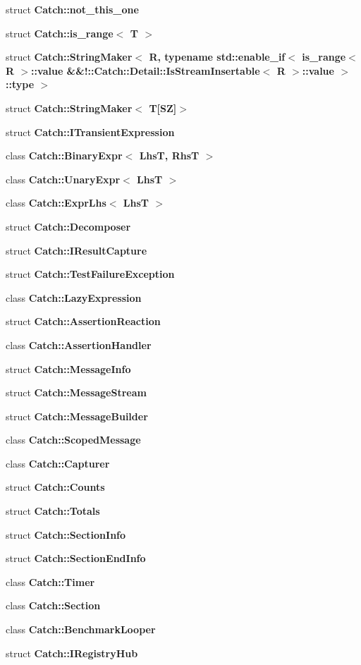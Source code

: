 \begin{DoxyCompactItemize}
struct \textbf{ Catch\+::not\+\_\+this\+\_\+one}
\item 
struct \textbf{ Catch\+::is\+\_\+range$<$ T $>$}
\item 
struct \textbf{ Catch\+::\+String\+Maker$<$ R, typename std\+::enable\+\_\+if$<$ is\+\_\+range$<$ R $>$\+::value \&\&!\+::\+Catch\+::\+Detail\+::\+Is\+Stream\+Insertable$<$ R $>$\+::value $>$\+::type $>$}
\item 
struct \textbf{ Catch\+::\+String\+Maker$<$ T[\+S\+Z]$>$}
\item 
struct \textbf{ Catch\+::\+I\+Transient\+Expression}
\item 
class \textbf{ Catch\+::\+Binary\+Expr$<$ Lhs\+T, Rhs\+T $>$}
\item 
class \textbf{ Catch\+::\+Unary\+Expr$<$ Lhs\+T $>$}
\item 
class \textbf{ Catch\+::\+Expr\+Lhs$<$ Lhs\+T $>$}
\item 
struct \textbf{ Catch\+::\+Decomposer}
\item 
struct \textbf{ Catch\+::\+I\+Result\+Capture}
\item 
struct \textbf{ Catch\+::\+Test\+Failure\+Exception}
\item 
class \textbf{ Catch\+::\+Lazy\+Expression}
\item 
struct \textbf{ Catch\+::\+Assertion\+Reaction}
\item 
class \textbf{ Catch\+::\+Assertion\+Handler}
\item 
struct \textbf{ Catch\+::\+Message\+Info}
\item 
struct \textbf{ Catch\+::\+Message\+Stream}
\item 
struct \textbf{ Catch\+::\+Message\+Builder}
\item 
class \textbf{ Catch\+::\+Scoped\+Message}
\item 
class \textbf{ Catch\+::\+Capturer}
\item 
struct \textbf{ Catch\+::\+Counts}
\item 
struct \textbf{ Catch\+::\+Totals}
\item 
struct \textbf{ Catch\+::\+Section\+Info}
\item 
struct \textbf{ Catch\+::\+Section\+End\+Info}
\item 
class \textbf{ Catch\+::\+Timer}
\item 
class \textbf{ Catch\+::\+Section}
\item 
class \textbf{ Catch\+::\+Benchmark\+Looper}
\item 
struct \textbf{ Catch\+::\+I\+Registry\+Hub}

\end{DoxyCompactItemize}
